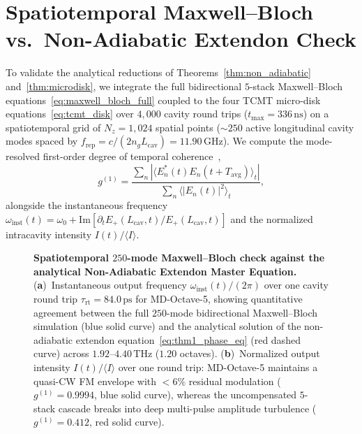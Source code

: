 \documentclass[11pt,letterpaper]{article}
\begin{document}
\section{Spatiotemporal Maxwell--Bloch vs.\ Non-Adiabatic Extendon Check}
\label{sec:mb_check}

To validate the analytical reductions of Theorems~\ref{thm:non_adiabatic} and~\ref{thm:microdisk}, we integrate the full bidirectional $5$-stack Maxwell--Bloch equations~\eqref{eq:maxwell_bloch_full} coupled to the four TCMT micro-disk equations~\eqref{eq:tcmt_disk} over $4{,}000$ cavity round trips ($t_{\max} = 336\,\mathrm{ns}$) on a spatiotemporal grid of $N_z = 1{,}024$ spatial points ($\sim 250$ active longitudinal cavity modes spaced by $f_{\mathrm{rep}} = c/(2 n_g L_{\mathrm{cav}}) = 11.90\,\mathrm{GHz}$). We compute the mode-resolved first-order degree of temporal coherence~\cite{Burghoff2020,SilvestriRoadmap2025},
\begin{equation}
g^{(1)} = \frac{\sum_{n} |\langle E_n^*(t) E_n(t + T_{\mathrm{avg}}) \rangle_t|}{\sum_n \langle |E_n(t)|^2 \rangle_t},
\label{eq:g1_coherence}
\end{equation}
alongside the instantaneous frequency $\omega_{\mathrm{inst}}(t) = \omega_0 + \mathrm{Im}[\partial_t E_+(L_{\mathrm{cav}}, t)/E_+(L_{\mathrm{cav}}, t)]$ and the normalized intracavity intensity $I(t)/\langle I\rangle$.

\begin{figure}[t!]
\centering
\resizebox{0.97\textwidth}{!}{}
\caption{\textbf{Spatiotemporal $250$-mode Maxwell--Bloch check against the analytical Non-Adiabatic Extendon Master Equation.} (\textbf{a})~Instantaneous output frequency $\omega_{\mathrm{inst}}(t)/(2\pi)$ over one cavity round trip $\tau_{\mathrm{rt}} = 84.0\,\mathrm{ps}$ for MD-Octave-5, showing quantitative agreement between the full $250$-mode bidirectional Maxwell--Bloch simulation (blue solid curve) and the analytical solution of the non-adiabatic extendon equation~\eqref{eq:thm1_phase_eq} (red dashed curve) across $1.92\text{--}4.40\,\mathrm{THz}$ ($1.20$ octaves). (\textbf{b})~Normalized output intensity $I(t)/\langle I\rangle$ over one round trip: MD-Octave-5 maintains a quasi-CW FM envelope with $<6\%$ residual modulation ($g^{(1)} = 0.9994$, blue solid curve), whereas the uncompensated $5$-stack cascade breaks into deep multi-pulse amplitude turbulence ($g^{(1)} = 0.412$, red solid curve).}
\label{fig:mb_extendon_check}
\end{figure}
\end{document}
